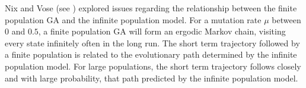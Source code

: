 Nix and Vose (see \cite{Nix1992}) explored issues regarding the relationship between the finite population GA and the infinite population model. 
For a mutation rate $\mu$ between $0$ and $0.5$, a finite population GA will form an ergodic Markov chain, 
visiting every state infinitely often in the long run.
The short term trajectory followed by a finite population is related to 
the evolutionary path determined by the infinite population model. 
For large populations, the short term trajectory follows closely and 
with large probability, that path predicted by 
the infinite population model. 


